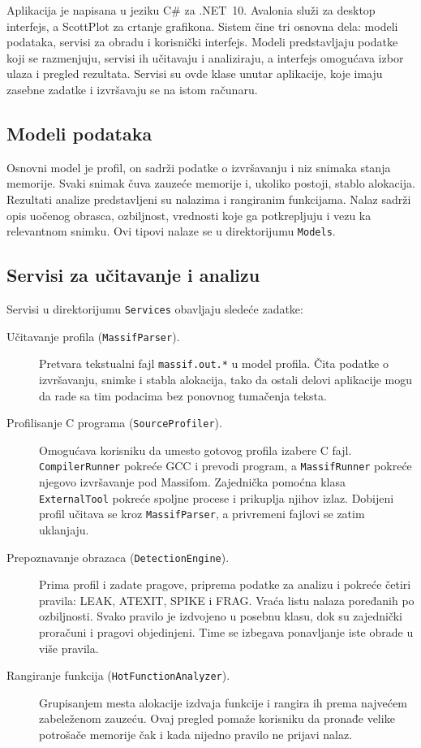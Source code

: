 \documentclass[a4paper,10pt]{article}
\begin{document}
Aplikacija je napisana u jeziku C\# za .NET~10. Avalonia služi za desktop
interfejs, a ScottPlot za crtanje grafikona. Sistem čine tri osnovna dela:
modeli podataka, servisi za obradu i korisnički interfejs. Modeli predstavljaju
podatke koji se razmenjuju, servisi ih učitavaju i analiziraju, a interfejs
omogućava izbor ulaza i pregled rezultata. Servisi su ovde klase unutar
aplikacije, koje imaju zasebne zadatke i izvršavaju se na istom računaru.

\subsection{Modeli podataka}

Osnovni model je profil, on sadrži podatke o izvršavanju i niz snimaka stanja
memorije. Svaki snimak čuva zauzeće memorije i, ukoliko postoji, stablo alokacija.
Rezultati analize predstavljeni su nalazima i rangiranim funkcijama. Nalaz
sadrži opis uočenog obrasca, ozbiljnost, vrednosti koje ga potkrepljuju i vezu
ka relevantnom snimku. Ovi tipovi nalaze se u direktorijumu \texttt{Models}.

\subsection{Servisi za učitavanje i analizu}

Servisi u direktorijumu \texttt{Services} obavljaju sledeće zadatke:

\begin{description}
  \item[Učitavanje profila (\texttt{MassifParser}).]
  Pretvara tekstualni fajl \texttt{massif.out.*} u model profila. Čita podatke
  o izvršavanju, snimke i stabla alokacija, tako da ostali delovi aplikacije
  mogu da rade sa tim podacima bez ponovnog tumačenja teksta.

  \item[Profilisanje C programa (\texttt{SourceProfiler}).]
  Omogućava korisniku da umesto gotovog profila izabere C fajl.
  \texttt{CompilerRunner} pokreće GCC i prevodi program, a
  \texttt{MassifRunner} pokreće njegovo izvršavanje pod Massifom.
  Zajednička pomoćna klasa \texttt{ExternalTool} pokreće spoljne procese i
  prikuplja njihov izlaz. Dobijeni profil učitava se kroz \texttt{MassifParser},
  a privremeni fajlovi se zatim uklanjaju.

  \item[Prepoznavanje obrazaca (\texttt{DetectionEngine}).]
  Prima profil i zadate pragove, priprema podatke za analizu i pokreće četiri
  pravila: LEAK, ATEXIT, SPIKE i FRAG. Vraća listu nalaza poređanih po
  ozbiljnosti. Svako pravilo je izdvojeno u posebnu klasu, dok su zajednički
  proračuni i pragovi objedinjeni. Time se izbegava ponavljanje iste obrade
  u više pravila.

  \item[Rangiranje funkcija (\texttt{HotFunctionAnalyzer}).]
  Grupisanjem mesta alokacije izdvaja funkcije i rangira ih prema najvećem
  zabeleženom zauzeću. Ovaj pregled pomaže korisniku da pronađe velike
  potrošače memorije čak i kada nijedno pravilo ne prijavi nalaz.
\end{description}
\end{document}
